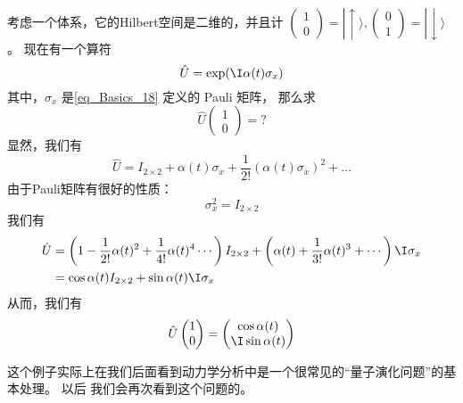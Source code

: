 \begin{exercise}{}
考虑一个体系，它的Hilbert空间是二维的，并且计 $\left(\begin{matrix}1 \\0\end{matrix}\right) = |\!\uparrow\rangle, \left(\begin{matrix}0 \\1\end{matrix}\right) = |\!\downarrow\rangle$。 现在有一个算符
\begin{equation}
\hat{U} = \exp(\I\alpha(t) \sigma_x)
\end{equation}
其中，$\sigma_x$ 是\autoref{eq_Basics_18} 定义的 Pauli 矩阵， 那么求
\begin{equation}
\hat{U} \left(\begin{matrix}1 \\0\end{matrix}\right) = ? 
\end{equation}
显然，我们有
\begin{equation}
\hat U= I_{2\times2} + \alpha(t) \sigma_x + \frac{1}{2!}\left(\alpha(t) \sigma_x\right)^2 + \dots
\end{equation}
由于Pauli矩阵有很好的性质：
\begin{equation}
\sigma_x^2 = I_{2\times2}
\end{equation}
我们有
\begin{equation}
\begin{split}\hat U &= \left(1 - \frac{1}{2!}\alpha(t)^2 + \frac{1}{4!}\alpha(t)^4  \cdots\right)  I_{2\times2} + \left(\alpha(t) + \frac{1}{3!}\alpha(t)^3 + \cdots \right)\I \sigma_x\\
& = \cos\alpha(t) I_{2\times2} + \sin\alpha(t) \I\sigma_x 
\end{split}
\end{equation}
从而，我们有
\begin{equation}
\hat U \left(\begin{matrix}1 \\0\end{matrix}\right)  =  \left(\begin{matrix}\cos\alpha(t) \\ \I \sin\alpha(t)\end{matrix}\right)
\end{equation}

这个例子实际上在我们后面看到动力学分析中是一个很常见的``量子演化问题''的基本处理。 以后%
我们会再次看到这个问题的。
\end{exercise}

